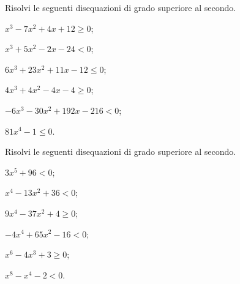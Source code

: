 \begin{esercizio}[\Ast]
 \label{ese:4.44}
Risolvi le seguenti disequazioni di grado superiore al secondo.
\begin{multicols}{2}
\begin{enumeratea}
\item $x^3-7x^2+4x+12\ge 0$;
\item $x^3+5x^2-2x-24<0$;
\item $6x^3+23x^2+11x-12\le 0$;
\item $4x^3+4x^2-4x-4\ge 0$;
\item $-6x^3-30x^2+192x-216<0$;
\item $81x^4-1\le 0$.
\end{enumeratea}
\end{multicols}
\end{esercizio}

\begin{esercizio}[\Ast]
 \label{ese:4.45}
Risolvi le seguenti disequazioni di grado superiore al secondo.
\begin{multicols}{2}
\begin{enumeratea}
\item $3x^5+96<0$;
\item $x^4-13x^2+36<0$;
\item $9x^4-37x^2+4\ge 0$;
\item $-4x^4+65x^2-16<0$;
\item $x^6-4x^3+3\ge 0$;
\item $x^8-x^4-2<0$.
\end{enumeratea}
\end{multicols}
\end{esercizio}

